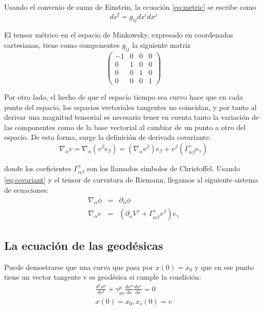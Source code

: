 \documentclass[a4paper,10pt]{article}
\begin{document}
\noindent
Usando el convenio de suma de Einstein, la ecuación \eqref{eq:metric} se escribe como
$$
ds^2 = g_{ij} dx^i dx^j
$$

\noindent
El tensor métrico en el espacio de Minkowsky, expresado en coordenadas 
cartesianas, tiene como componentes $g_{ij}$ la siguiente matriz
$$
\begin{pmatrix}
-1 & 0 & 0 & 0 \\
0 & 1 & 0 & 0 \\
0 & 0 & 1 & 0 \\
0 & 0 & 0 & 1
\end{pmatrix}
$$

\noindent
Por otro lado, el hecho de que el espacio tiempo sea curvo hace que en cada
punto del espacio, los espacios vectoriales tangentes no coincidan, y por tanto al
derivar una magnitud tensorial es necesario tener en cuenta tanto la variación
de las componentes como de la base vectorial al cambiar de un punto a otro del
espacio. De esta forma, surge la definición de derivada covariante:
\begin{equation}
\label{eq:covariant}
\nabla_{\alpha} v = \nabla_{\alpha} (v^{\beta} e_{\beta}) = (\nabla_{\alpha}v^{\beta})e_{\beta} + v^{\beta}(\Gamma^{\gamma}_{\alpha \beta}e_{\gamma})
\end{equation}

\noindent
donde los coeficientes $\Gamma^{\gamma}_{\alpha \beta}$ son los llamados 
símbolos de Christoffel. Usando \eqref{eq:covariant} y el tensor de curvatura 
de Riemann, llegamos al siguiente sistema de ecuaciones:
\begin{eqnarray}
\nabla_{\alpha} \phi &=& \partial_{\alpha} \phi \label{eq:eq_01} \\
\nabla_{\alpha} v    &=& (\partial_{\alpha} V^{\gamma} + \Gamma_{\alpha \beta}^\gamma v^{\beta})e_{\gamma}  \label{eq:eq_02}
\end{eqnarray}


\subsection{La ecuación de las geodésicas}
Puede demostrarse que una curva que pasa por $x(0) = x_0$ y que en ese punto
tiene un vector tangente v es geodésica si cumple la condición:
\begin{equation}
\begin{split}
\frac{d^2x^\mu}{ds^2} + \gamma^\mu_{\sigma \nu} \frac{dx^\sigma}{ds} \frac{dx^\nu}{ds} = 0 \\
x(0) = x_0 , x_s(0) = v
\end{split}
\end{equation}
\end{document}
